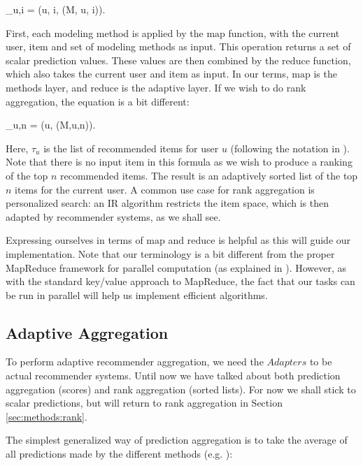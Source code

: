 \begin{eqsp}
  _{u,i} = (u, i, (M, u, i)).
\end{eqsp}

First, each modeling method is applied by the $\mathrm{map}$ function, with the current user, item and set of modeling methods as input.
This operation returns a set of scalar prediction values. 
These values are then combined by the $\mathrm{reduce}$ function, which also takes the current user and item as input.
In our terms, $\mathrm{map}$ is the methods layer, and $\mathrm{reduce}$ is the adaptive layer.
If we wish to do rank aggregation, the equation is a bit different:

\begin{eqsp}
  \tau_{u,n} = (u, (M,u,n)).
\end{eqsp}

Here, $\tau_{u}$ is the list of recommended items for user $u$ (following the notation in \citet[p3]{Dwork2001}).
Note that there is no input item in this formula as we wish to produce a ranking of the top $n$ recommended items.
The result is an adaptively sorted list of the top $n$ items for the current user.
A common use case for rank aggregation is personalized search:
an IR algorithm restricts the item space, which is then adapted by recommender systems,
as we shall see.

Expressing ourselves in terms of $\mathrm{map}$ and $\mathrm{reduce}$ is helpful 
as this will guide our implementation.
Note that our terminology is a bit different from the proper MapReduce framework
for parallel computation (as explained in \citet[p75]{Manning2008}).
However, as with the standard key/value approach to MapReduce,
the fact that our tasks can be run in parallel will help
us implement efficient algorithms.


\subsection{Adaptive Aggregation}

To perform adaptive recommender aggregation, we need the $Adapters$ to be actual recommender systems.
Until now we have talked about both prediction aggregation (scores) and rank aggregation (sorted lists).
For now we shall stick to scalar predictions, but will return to rank aggregation in Section \ref{sec:methods:rank}.

The simplest generalized way of prediction aggregation is to take the average of all predictions made
by the different methods (e.g. \citet[p3]{Aslam2001}):

